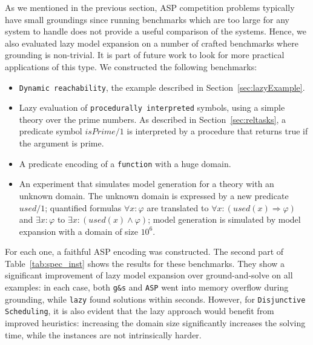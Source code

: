 \documentclass[11pt]{article}
\theoremstyle{plain}
\theoremstyle{definition}
\theoremstyle{example_basic}
\theoremstyle{example_contd}
\theoremstyle{plain}
\newcommand{\disjsched}			{\texttt{Disjunctive Scheduling}\xspace}
\newcommand{\change}[1]{#1}
\begin{document}
\change{As we mentioned in the previous section, ASP competition problems
  typically have small groundings since running benchmarks which are too
  large for any system to handle does not provide a useful comparison of
  the systems. 
  Hence, we also evaluated lazy model
  expansion on a number of crafted benchmarks where grounding is
  non-trivial. 
It is part of future work to look for more practical applications of this type. We constructed the following benchmarks:}
\begin{itemize}
  \item \texttt{Dynamic reachability}, the example described in Section~\ref{sec:lazyExample}.
  \item Lazy evaluation of \texttt{procedurally interpreted} symbols, using a simple theory over the prime numbers. As described in Section~\ref{sec:reltasks}, a predicate symbol $isPrime/1$ is interpreted by a procedure that returns true if the argument is prime.
  \item A predicate encoding of a \texttt{function} with a huge domain.
   \item  \change{An  experiment that simulates  model generation for a theory with an unknown domain.  The unknown domain is expressed by a new predicate $used/1$; quantified  formulas $\forall x: \varphi$ are  translated to $\forall x: (used(x) \Rightarrow \varphi)$ and $\exists x: \varphi$  to $\exists x: (used(x) \land \varphi)$; model generation is simulated by model expansion with  a domain of size $10^6$. }
\end{itemize}
For each one, a faithful ASP encoding was constructed. \change{The second part of Table~\ref{tab:spec_inst} shows the results for these benchmarks. They show a significant improvement of lazy model expansion over ground-and-solve on all examples: in each case, both \texttt{g\&s} and \texttt{ASP} went into memory overflow during grounding, while \texttt{lazy} found solutions within seconds. However, for \disjsched, it is also evident that the lazy approach would benefit from improved heuristics: increasing the domain size significantly increases the solving time, while the instances are not intrinsically harder.}
\end{document}
